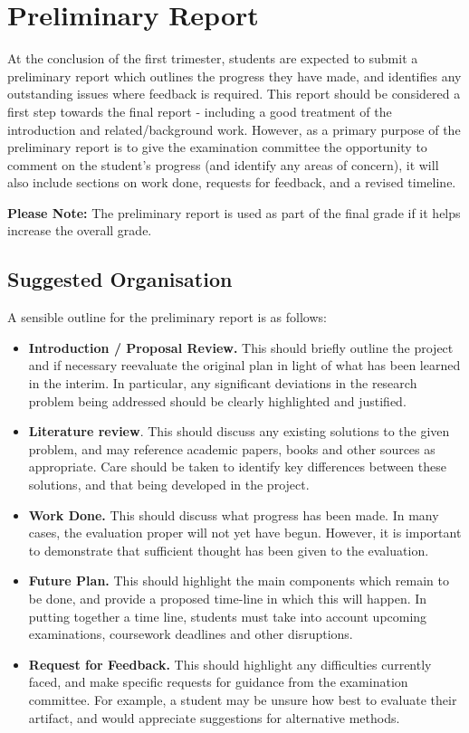 \chapter{Preliminary Report}
At the conclusion of the first trimester, students are expected to
submit a preliminary report which outlines the progress they have made,
and identifies any outstanding issues where feedback is required. This
report should be considered a first step towards the final report -
including a good treatment of the introduction and related/background
work.  However, as a primary purpose of the preliminary report is to give the examination
committee the opportunity to comment on the student's progress (and
identify any areas of concern), it will also include sections on work
done, requests for feedback, and a revised timeline.

{\bf Please Note:}   The preliminary report is used as part of the final grade if it helps increase the overall grade.

\section{Suggested Organisation}
A sensible outline for the preliminary report is as follows:
\begin{itemize}
\item {\bf Introduction / Proposal Review.}  This should briefly
  outline the project and if necessary reevaluate the original plan in light of
  what has been learned in the interim.  In particular, any significant
  deviations in the research problem being addressed
  should be clearly highlighted and justified.
\item {\bf Literature review}.  This should discuss any existing
  solutions to the given problem, and may reference academic papers,
  books and other sources as appropriate.  Care should be taken to
  identify key differences between these solutions, and that being
  developed in the project.
\item {\bf Work Done.}  This should discuss what progress has been
  made.  In
  many cases, the evaluation proper will not yet have begun.  However,
  it is important to demonstrate that sufficient thought has been
  given to the evaluation.
\item {\bf Future Plan.}  This should highlight the main components
  which remain to be done, and provide a proposed time-line in which
  this will happen.  In putting together a time line, students must
  take into account upcoming examinations, coursework deadlines and
  other disruptions.
\item {\bf Request for Feedback.}  This should highlight any
  difficulties currently faced, and make specific requests for
  guidance from the examination committee.  For example, a student may
  be unsure how best to evaluate their artifact, and would appreciate
  suggestions for alternative methods.
\end{itemize}

